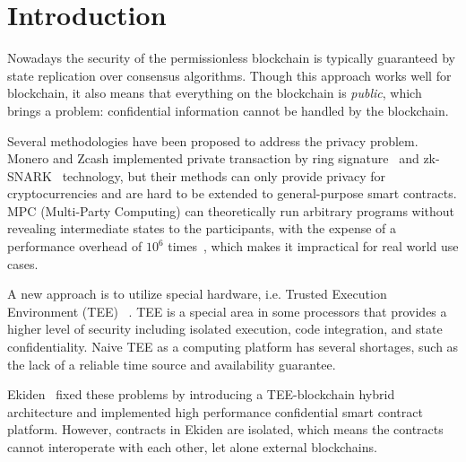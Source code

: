 \section{Introduction}

Nowadays the security of the permissionless blockchain is typically guaranteed by state replication over consensus algorithms. Though this approach works well for blockchain, it also means that everything on the blockchain is \textit{public}, which brings a problem: confidential information cannot be handled by the blockchain.

Several methodologies have been proposed to address the privacy problem. Monero and Zcash implemented private transaction by ring signature~\cite{monero} and zk-SNARK~\cite{zcash} technology, but their methods can only provide privacy for cryptocurrencies and are hard to be extended to general-purpose smart contracts. MPC (Multi-Party Computing) can theoretically run arbitrary programs without revealing intermediate states to the participants, with the expense of a performance overhead of $10^6$ times~\cite{cheng2019ekiden}, which makes it impractical for real world use cases.

A new approach is to utilize special hardware, i.e. Trusted Execution Environment (TEE)~\cite{teewiki} . TEE is a special area in some processors that provides a higher level of security including isolated execution, code integration, and state confidentiality. Naive TEE as a computing platform has several shortages, such as the lack of a reliable time source and availability guarantee.

Ekiden~\cite{cheng2019ekiden} fixed these problems by introducing a TEE-blockchain hybrid architecture and implemented high performance confidential smart contract platform. However, contracts in Ekiden are isolated, which means the contracts cannot interoperate with each other, let alone external blockchains.


